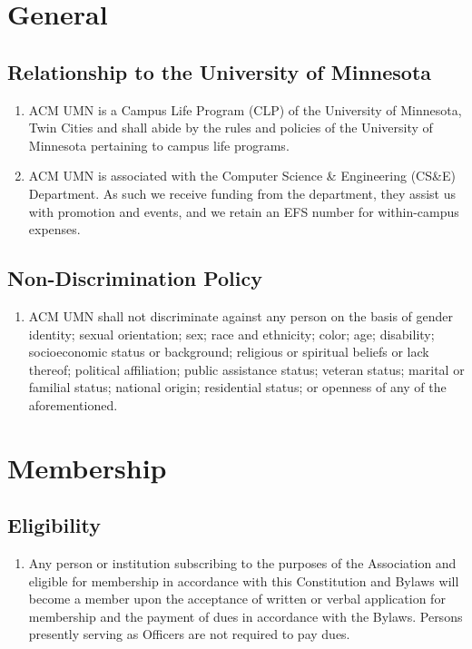 



\section{General}



\subsection{Relationship to the University of Minnesota}
\begin{enumerate}
	\item ACM UMN is a Campus Life Program (CLP) of the University of Minnesota, Twin Cities and shall abide by the rules and policies of the University of Minnesota pertaining to campus life programs.
	\item ACM UMN is associated with the Computer Science \& Engineering (CS\&E) Department. As such we receive funding from the department, they assist us with promotion and events, and we retain an EFS number for within-campus expenses.
\end{enumerate}

\subsection{Non-Discrimination Policy}
\begin{enumerate}
	\item ACM UMN shall not discriminate against any person on the basis of gender identity; sexual orientation; sex; race and ethnicity; color; age; disability; socioeconomic status or background; religious or spiritual beliefs or lack thereof; political affiliation; public assistance status; veteran status; marital or familial status; national origin; residential status; or openness of any of the aforementioned.
\end{enumerate}

\section{Membership}

\subsection{Eligibility}
\begin{enumerate}
	\item Any person or institution subscribing to the purposes of the Association and eligible for membership in accordance with this Constitution and Bylaws will become a member upon the acceptance of written or verbal application for membership and the payment of dues in accordance with the Bylaws. Persons presently serving as Officers are not required to pay dues.
\end{enumerate}

